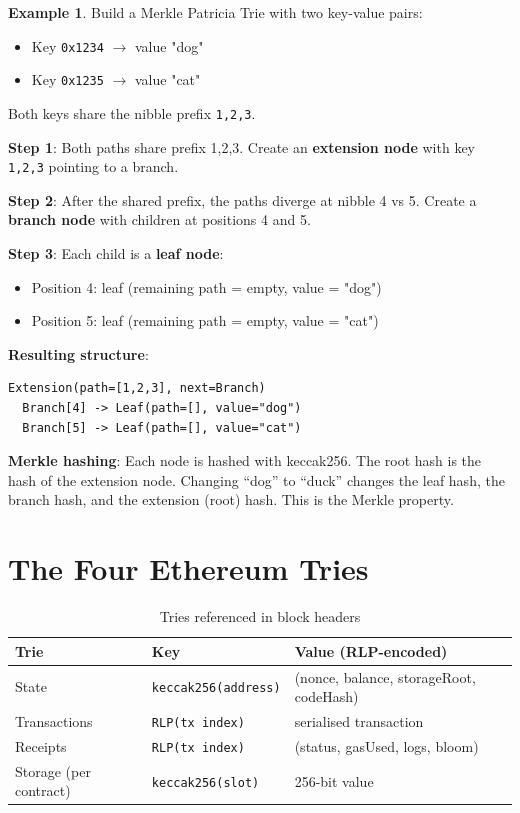\documentclass[12pt,a4paper,openany]{book}
\theoremstyle{definition}
\newtheorem{example}{Example}[chapter]
\theoremstyle{plain}
\theoremstyle{remark}
\begin{document}
\begin{example}
  Build a Merkle Patricia Trie with two key-value pairs:
  \begin{itemize}
    \item Key \texttt{0x1234} $\to$ value "dog"
    \item Key \texttt{0x1235} $\to$ value "cat"
  \end{itemize}

  Both keys share the nibble prefix \texttt{1,2,3}.

  \textbf{Step 1}: Both paths share prefix 1,2,3.  Create an
  \textbf{extension node} with key \texttt{1,2,3} pointing to a branch.

  \textbf{Step 2}: After the shared prefix, the paths diverge at nibble
  4 vs 5.  Create a \textbf{branch node} with children at positions 4
  and 5.

  \textbf{Step 3}: Each child is a \textbf{leaf node}:
  \begin{itemize}
    \item Position 4: leaf (remaining path = empty, value = "dog")
    \item Position 5: leaf (remaining path = empty, value = "cat")
  \end{itemize}

  \textbf{Resulting structure}:
\begin{lstlisting}[language={}]
Extension(path=[1,2,3], next=Branch)
  Branch[4] -> Leaf(path=[], value="dog")
  Branch[5] -> Leaf(path=[], value="cat")
\end{lstlisting}

  \textbf{Merkle hashing}: Each node is hashed with keccak256.  The root
  hash is the hash of the extension node.  Changing ``dog'' to ``duck''
  changes the leaf hash, the branch hash, and the extension (root) hash.
  This is the Merkle property.
\end{example}

\section{The Four Ethereum Tries}

\begin{table}[h]
\centering
\caption{Tries referenced in block headers}
\begin{tabular}{p{3cm}p{4cm}p{5cm}}
\toprule
\textbf{Trie} & \textbf{Key} & \textbf{Value (RLP-encoded)} \\
\midrule
State          & \texttt{keccak256(address)} & (nonce, balance, storageRoot, codeHash) \\
Transactions   & \texttt{RLP(tx index)} & serialised transaction \\
Receipts       & \texttt{RLP(tx index)} & (status, gasUsed, logs, bloom) \\
Storage (per contract) & \texttt{keccak256(slot)} & 256-bit value \\
\bottomrule
\end{tabular}
\end{table}
\end{document}
